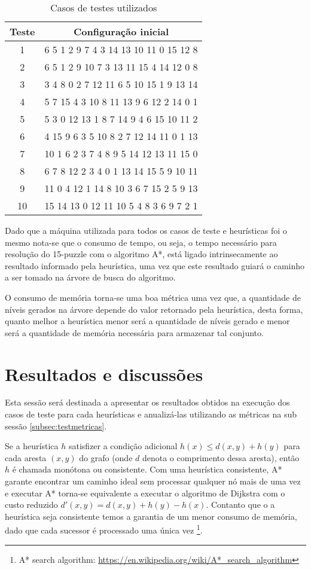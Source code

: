 \documentclass[12pt]{article}
\begin{document}
\begin{table}[H]
\centering
\begin{tabular}{cc}
\hline
\textbf{Teste} & \textbf{Configuração inicial} \\ \hline
1 & 6 5 1 2 9 7 4 3 14 13 10 11 0 15 12 8 \\ \hline
2 & 6 5 1 2 9 10 7 3 13 11 15  4 14 12 0 8 \\ \hline
3 & 3 4 8 0 2 7 12 11 6 5 10 15 1 9 13 14 \\ \hline
4 & 5 7 15 4 3 10 8 11 13 9 6 12 2 14 0 1 \\ \hline
5 & 5 3 0 12 13 1 8 7 14 9 4 6 15 10 11 2 \\ \hline
6 & 4 15 9 6 3 5 10 8 2 7 12 14 11 0 1 13 \\ \hline
7 & 10 1 6 2 3 7 4 8 9 5 14 12 13 11 15 0 \\ \hline
8 & 6 7 8 12 2 3 4 0 1 13 14 15 5 9 10 11 \\ \hline
9 & 11 0 4 12 1 14 8 10 3 6 7 15 2 5 9 13 \\ \hline
10 & 15 14 13 0 12 11 10 5 4 8 3 6 9 7 2 1 \\ \hline
\end{tabular}
\caption{Casos de testes utilizados}
\label{tab:testes}
\end{table}

Dado que a máquina utilizada para todos os casos de teste e heurísticas foi o mesmo nota-se que o consumo de tempo, ou seja, o tempo necessário para resolução do 15-puzzle com o algoritmo A*, está ligado intrinsecamente ao resultado informado pela heurística, uma vez que este resultado guiará o caminho a ser tomado na árvore de busca do algoritmo.

O consumo de memória torna-se uma boa métrica uma vez que, a quantidade de níveis gerados na árvore depende do valor retornado pela heurística, desta forma, quanto melhor a heurística menor será a quantidade de níveis gerado e menor será a quantidade de memória necessária para armazenar tal conjunto.

\section{Resultados e discussões}\label{sec:resultados}

Esta sessão será destinada a apresentar os resultados obtidos na execução dos casos de teste para cada heurísticas e anualizá-las utilizando as métricas na sub sessão \ref{subsec:testmetricas}.

Se a heurística $h$ satisfizer a condição adicional $h(x) \leq d (x, y) + h(y)$ para cada aresta $(x, y)$ do grafo (onde $d$ denota o comprimento dessa aresta), então $h$ é chamada monótona ou consistente. Com uma heurística consistente, A* garante encontrar um caminho ideal sem processar qualquer nó mais de uma vez e executar A* torna-se equivalente a executar o algoritmo de Dijkstra com o custo reduzido $d'(x, y) = d(x, y) + h(y) - h(x)$. Contanto que o a heurística seja consistente temos a garantia de um menor consumo de memória, dado que cada sucessor é processado uma única vez \footnote{A* search algorithm: \url{https://en.wikipedia.org/wiki/A*_search_algorithm}}. 
\end{document}
